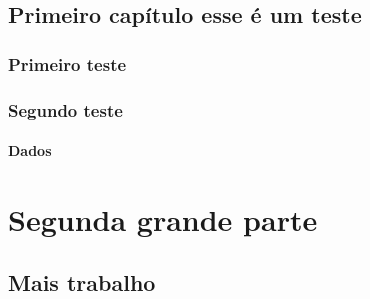 \chapter{Primeiro capítulo esse é um teste}
\lipsum
\section{Primeiro teste}
\lipsum[1]
\section{Segundo teste}
\lipsum[2]
\subsection{Dados}
\lipsum[3]
\part{Segunda grande parte}
\lipsum
\chapter{Mais trabalho}
\lipsum[1]